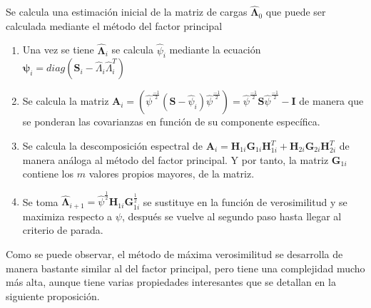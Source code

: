 \newpage
\noindent Se calcula una estimación inicial de la matriz de cargas $\mathbf{\hat{\Lambda}}_0$ que puede ser calculada mediante el método del factor principal
\begin{enumerate}
\item Una vez se tiene $\mathbf{\hat{\Lambda}}_i$ se calcula $\hat{\psi}_i$ mediante la ecuación $\mathbf{\hat{\psi}}_i=diag(\textbf{S}_i-\hat{\Lambda}_i\hat{\Lambda}_i^T )$
\item Se calcula la matriz $\textbf{A}_i=(\hat{\psi}^{\frac{-1}{2}}(\textbf{S}-\hat{\psi}_i)\hat{\psi}^{\frac{-1}{2}})=\hat{\psi}^{\frac{-1}{2}}\textbf{S}\hat{\psi}^{\frac{-1}{2}}-\textbf{I}$ de manera que se ponderan las covarianzas en función de su componente específica. 
\item Se calcula la descomposición espectral de $\textbf{A}_i=\textbf{H}_{1i}\textbf{G}_{1i}\textbf{H}_{1i}^T+\textbf{H}_{2i}\textbf{G}_{2i}\textbf{H}_{2i}^T$ de manera análoga al método del factor principal. Y por tanto, la matriz $\textbf{G}_{1i}$ contiene los $m$ valores propios mayores, de la matriz.  
\item Se toma $\mathbf{\hat{\Lambda}}_{i+1}=\hat{\psi}^{\frac{1}{2}}\textbf{H}_{1i}\textbf{G}_{1i}^{\frac{1}{2}}$ se sustituye en la función de verosimilitud y se maximiza respecto a $\psi$, después se vuelve al segundo paso hasta llegar al criterio de parada. 
\end{enumerate}

\noindent Como se puede observar, el método de máxima verosimilitud se desarrolla de manera bastante similar al del factor principal, pero tiene una complejidad mucho más alta, aunque tiene varias propiedades interesantes que se detallan en la siguiente proposición. 

